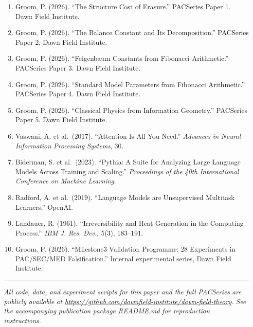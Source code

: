 \documentclass[
  11pt,
  a4paper]{article}
\providecommand{\tightlist}{%
  \setlength{\itemsep}{0pt}\setlength{\parskip}{0pt}}
\begin{document}
\begin{enumerate}
\def\labelenumi{\arabic{enumi}.}
\tightlist
\item
  Groom, P. (2026). ``The Structure Cost of Erasure.'' PACSeries Paper
  1. Dawn Field Institute.
\item
  Groom, P. (2026). ``The Balance Constant and Its Decomposition.''
  PACSeries Paper 2. Dawn Field Institute.
\item
  Groom, P. (2026). ``Feigenbaum Constants from Fibonacci Arithmetic.''
  PACSeries Paper 3. Dawn Field Institute.
\item
  Groom, P. (2026). ``Standard Model Parameters from Fibonacci
  Arithmetic.'' PACSeries Paper 4. Dawn Field Institute.
\item
  Groom, P. (2026). ``Classical Physics from Information Geometry.''
  PACSeries Paper 5. Dawn Field Institute.
\item
  Vaswani, A. et al.~(2017). ``Attention Is All You Need.''
  \emph{Advances in Neural Information Processing Systems}, 30.
\item
  Biderman, S. et al.~(2023). ``Pythia: A Suite for Analyzing Large
  Language Models Across Training and Scaling.'' \emph{Proceedings of
  the 40th International Conference on Machine Learning}.
\item
  Radford, A. et al.~(2019). ``Language Models are Unsupervised
  Multitask Learners.'' OpenAI.
\item
  Landauer, R. (1961). ``Irreversibility and Heat Generation in the
  Computing Process.'' \emph{IBM J. Res. Dev.}, 5(3), 183--191.
\item
  Groom, P. (2026). ``Milestone3 Validation Programme: 28 Experiments in
  PAC/SEC/MED Falsification.'' Internal experimental series, Dawn Field
  Institute.
\end{enumerate}

\begin{center}\rule{0.5\linewidth}{0.5pt}\end{center}

\emph{All code, data, and experiment scripts for this paper and the full
PACSeries are publicly available at
\url{https://github.com/dawnfield-institute/dawn-field-theory}. See the
accompanying publication package README.md for reproduction
instructions.}
\end{document}
